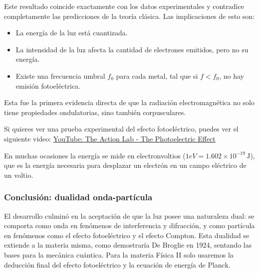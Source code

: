 Este resultado coincide exactamente con los datos experimentales y contradice completamente las predicciones de la teoría clásica. Las implicaciones de esto son:

\begin{itemize}
  \item La energía de la luz está cuantizada.
  \item La intensidad de la luz afecta la cantidad de electrones emitidos, pero no su energía.
  \item Existe una frecuencia umbral \(f_0\) para cada metal, tal que si \(f < f_0\), no hay emisión fotoeléctrica.
\end{itemize}

Esta fue la primera evidencia directa de que la radiación electromagnética no solo tiene propiedades ondulatorias, sino también corpusculares.

Si quieres ver una prueba experimental del efecto fotoeléctrico, puedes ver el siguiente video: \href{https://youtu.be/oYnp0WZDhYQ?si=kIBH75DIIDv5hg_4}{YouTube: The Action Lab - The Photoelectric Effect}

\begin{tcolorbox}[myconclusion]
  En muchas ocasiones la energía se mide en electronvoltios (\(1 eV = 1.602 \times 10^{-19} \, \text{J}\)), que es la energía necesaria para desplazar un electrón en un campo eléctrico de un voltio.
\end{tcolorbox}

\subsubsection{Conclusión: dualidad onda-partícula}

El desarrollo culminó en la aceptación de que la luz posee una naturaleza dual: se comporta como onda en fenómenos de interferencia y difracción, y como partícula en fenómenos como el efecto fotoeléctrico y el efecto Compton. Esta dualidad se extiende a la materia misma, como demostraría De Broglie en 1924, sentando las bases para la mecánica cuántica. Para la materia Física II solo usaremos la deducción final del efecto fotoeléctrico y la ecuación de energía de Planck.